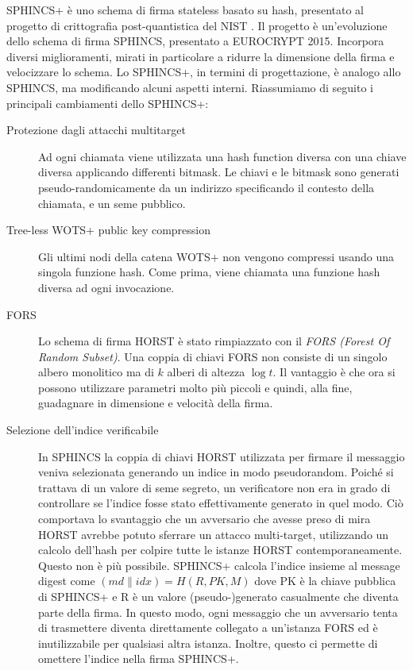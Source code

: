 SPHINCS+ è uno schema di firma stateless basato su hash, presentato al progetto di crittografia post-quantistica del NIST \cite{Bernstein2017SPHINCSS}. Il progetto è un'evoluzione dello schema di firma SPHINCS, presentato a EUROCRYPT 2015. Incorpora diversi miglioramenti, mirati in particolare a ridurre la dimensione della firma e velocizzare lo schema. Lo SPHINCS+, in termini di progettazione, è analogo allo SPHINCS, ma modificando alcuni aspetti interni. Riassumiamo di seguito i principali cambiamenti dello SPHINCS+:
\begin{description}
  \item[Protezione dagli attacchi multitarget] Ad ogni chiamata viene utilizzata una hash function diversa con una chiave diversa applicando differenti bitmask. Le chiavi e le bitmask sono generati pseudo-randomicamente da un indirizzo specificando il contesto della chiamata, e un seme pubblico.
  \item[Tree-less WOTS+ public key compression] Gli ultimi nodi della catena WOTS+ non vengono compressi usando una singola funzione hash. Come prima, viene chiamata una funzione hash diversa ad ogni invocazione.
  \item[FORS] Lo schema di firma HORST è stato rimpiazzato con il \textit{FORS (Forest Of Random Subset)}. Una coppia di chiavi FORS non consiste di un singolo albero monolitico ma di \(k\) alberi di altezza \(\log t\). Il vantaggio è che ora si possono utilizzare parametri molto più piccoli e quindi, alla fine, guadagnare in dimensione e velocità della firma.
  \item[Selezione dell'indice verificabile] In SPHINCS la coppia di chiavi HORST utilizzata per firmare il messaggio veniva selezionata generando un indice in modo pseudorandom. Poiché si trattava di un valore di seme segreto, un verificatore non era in grado di controllare se l'indice fosse stato effettivamente generato in quel modo.  Ciò comportava lo svantaggio che un avversario che avesse preso di mira HORST avrebbe potuto sferrare un attacco multi-target, utilizzando un calcolo dell'hash per colpire tutte le istanze HORST contemporaneamente. Questo non è più possibile. SPHINCS+ calcola l'indice insieme al message digest come \(( md \| idx ) = H ( R, PK, M )\) dove PK è la chiave pubblica di SPHINCS+ e R è un valore (pseudo-)generato casualmente che diventa parte della firma. In questo modo, ogni messaggio che un avversario tenta di trasmettere diventa direttamente collegato a un'istanza FORS ed è inutilizzabile per qualsiasi altra istanza. Inoltre, questo ci permette di omettere l'indice nella firma SPHINCS+.
\end{description}
